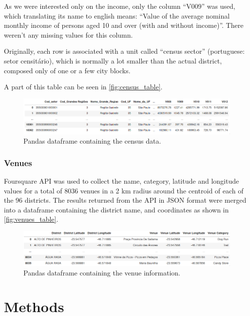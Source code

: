 \documentclass[12pt]{article}
\begin{document}
As we were interested only on the income, only the column ``V009'' was used,
which translating its name to english means: ``Value of the average nominal
monthly income of persons aged 10 and over (with and without income)''. There
weren't any missing values for this column.

Originally, each row is associated with a unit called ``census sector''
(portuguese: setor censitário), which is normally a lot smaller than the actual
district, composed only of one or a few city blocks.

A part of this table can be seen in \autoref{fig:census_table}.

\begin{figure}[h]
        \centering
        \includegraphics[width=\linewidth]{census_table.png}
        \caption{Pandas dataframe containing the census data.\label{fig:census_table}}
\end{figure}

\subsubsection{Venues}

Foursquare API was used to collect the name, category, latitude and longitude
values for a total of 8036 venues in a 2 km radius around the centroid of each
of the 96 districts. The results returned from the API in JSON format were
merged into a dataframe containing the district name, and coordinates as shown
in \autoref{fig:venues_table}.

\begin{figure}[h]
        \centering
        \includegraphics[width=\linewidth]{venues_table.png}
        \caption{Pandas dataframe containing the venue information.\label{fig:venues_table}}
\end{figure}



\section{Methods}
\end{document}

